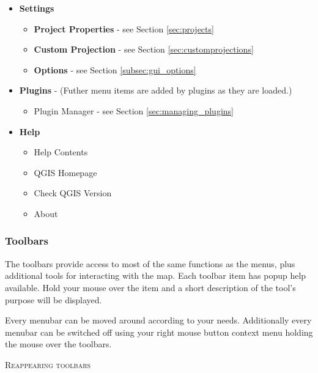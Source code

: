 \begin{itemize}
\item \textbf{Settings}
\begin{itemize}
\item \textbf{Project Properties}  - see Section \ref{sec:projects}
\item \textbf{Custom Projection}   - see Section \ref{sec:customprojections}
\item \textbf{Options}             - see Section \ref{subsec:gui_options}
\end{itemize}

\item \textbf{Plugins} - (Futher menu items are added by plugins as they are loaded.)
\begin{itemize}
\item Plugin Manager          	   - see Section \ref{sec:managing_plugins}
\end{itemize}          	

\item \textbf{Help}
\begin{itemize}
\item Help Contents
\item QGIS Homepage
\item Check QGIS Version
\item About
\end{itemize}

\end{itemize}


\subsubsection{Toolbars}\label{label_toolbars}

The toolbars provide access to most of the same functions as the menus,
plus additional tools for interacting with the map. Each toolbar item has
popup help available. Hold your mouse over the item and a short description of
the tool's purpose will be displayed. 

Every menubar can be moved around according to your needs. Additionally every
menubar can be switched off using your right mouse button context menu holding
the mouse over the toolbars.

\begin{Tip}
\caption{\textsc{Reappearing toolbars}} 
\end{Tip}

